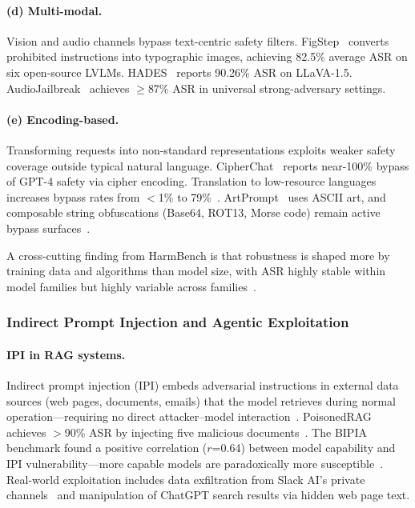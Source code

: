 \paragraph{(d) Multi-modal.}
Vision and audio channels bypass text-centric safety filters. FigStep~\cite{gong2025figstep} converts prohibited instructions into typographic images, achieving 82.5\% average ASR on six open-source LVLMs. HADES~\cite{li2024hades} reports 90.26\% ASR on LLaVA-1.5. AudioJailbreak~\cite{chen2025audiojailbreak} achieves $\geq$87\% ASR in universal strong-adversary settings.

\paragraph{(e) Encoding-based.}
Transforming requests into non-standard representations exploits weaker safety coverage outside typical natural language. CipherChat~\cite{yuan2024cipherchat} reports near-100\% bypass of GPT-4 safety via cipher encoding. Translation to low-resource languages increases bypass rates from $<$1\% to 79\%~\cite{yong2023lowresource,deng2024multilingual}. ArtPrompt~\cite{jiang2024artprompt} uses ASCII art, and composable string obfuscations (Base64, ROT13, Morse code) remain active bypass surfaces~\cite{huang2024plentiful}.

A cross-cutting finding from HarmBench is that robustness is shaped more by training data and algorithms than model size, with ASR highly stable within model families but highly variable across families~\cite{mazeika2024harmbench}.


\subsubsection{Indirect Prompt Injection and Agentic Exploitation}
\label{sec:threat-ipi}

\paragraph{IPI in RAG systems.}
Indirect prompt injection (IPI) embeds adversarial instructions in external data sources (web pages, documents, emails) that the model retrieves during normal operation---requiring no direct attacker--model interaction~\cite{greshake2023ipi}. PoisonedRAG achieves $>$90\% ASR by injecting five malicious documents~\cite{zou2025poisonedrag}. The BIPIA benchmark found a positive correlation ($r$=0.64) between model capability and IPI vulnerability---more capable models are paradoxically more susceptible~\cite{yi2025bipia}. Real-world exploitation includes data exfiltration from Slack AI's private channels~\cite{promptarmor2024slack} and manipulation of ChatGPT search results via hidden web page text.


